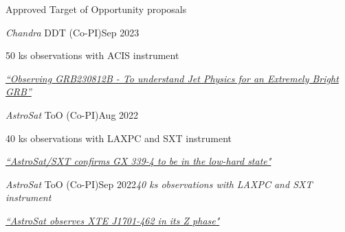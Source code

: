 \begin{rSection}{Approved Target of Opportunity proposals}
\hspace{-1.2em}\begin{rSubsection}{\textit{Chandra} DDT (Co-PI)}{Sep 2023}
{}{}
\vspace{-0.5em}
\item[] 50 ks observations with ACIS instrument
\item[] \href{https://gcn.nasa.gov/circulars/34632}{\textit{“Observing GRB230812B - To understand Jet Physics for an Extremely Bright GRB”}}
\end{rSubsection}

\vspace{-0.5em}

\hspace{-1.2em}\begin{rSubsection}{\textit{AstroSat} ToO (Co-PI)}{Aug 2022}{}{}
\vspace{-0.5em}
\item[] 40 ks observations with LAXPC and SXT instrument
\item[] \href{https://www.astronomerstelegram.org/?read=15615}{\textit{``AstroSat/SXT confirms GX 339-4 to be in the low-hard state"}}
\end{rSubsection}

\vspace{-0.5em}

\hspace{-1.2em}\begin{rSubsection}{\textit{AstroSat} ToO (Co-PI)}{Sep 2022}{\emph{40 ks observations with LAXPC and SXT instrument}}{}
\vspace{-0.5em}
\item[] \href{https://www.astronomerstelegram.org/?read=15654}{\textit{``AstroSat observes XTE J1701-462 in its Z phase"}}
\end{rSubsection}
\end{rSection}